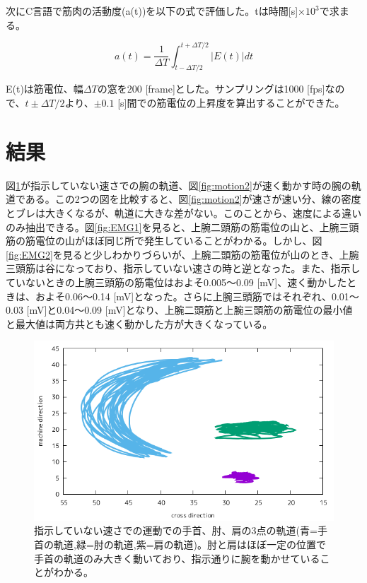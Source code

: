 \documentclass{jsarticle}
\begin{document}
次にC言語で筋肉の活動度(a(t))を以下の式で評価した。tは時間[s]×$10^3$で求まる。

\begin{equation}
a(t)=\frac{1}{\Delta{T}}\int^{t+\Delta{T}/2}_{t-\Delta{T}/2} |E(t)|dt
\end{equation}

E(t)は筋電位、幅$\Delta{T}$の窓を200 [frame]とした。サンプリングは1000 [fps]なので、$t\pm\Delta{T}/2$より、$\pm0.1$ [s]間での筋電位の上昇度を算出することができた。

\section{結果}

図\ref{fig:motion1}が指示していない速さでの腕の軌道、図\ref{fig:motion2}が速く動かす時の腕の軌道である。この2つの図を比較すると、図\ref{fig:motion2}が速さが速い分、線の密度とブレは大きくなるが、軌道に大きな差がない。このことから、速度による違いのみ抽出できる。図\ref{fig:EMG1}を見ると、上腕二頭筋の筋電位の山と、上腕三頭筋の筋電位の山がほぼ同じ所で発生していることがわかる。しかし、図\ref{fig:EMG2}を見ると少しわかりづらいが、上腕二頭筋の筋電位が山のとき、上腕三頭筋は谷になっており、指示していない速さの時と逆となった。また、指示していないときの上腕三頭筋の筋電位はおよそ0.005〜0.09 [mV]、速く動かしたときは、およそ0.06〜0.14 [mV]となった。さらに上腕三頭筋ではそれぞれ、0.01〜0.03 [mV]と0.04〜0.09 [mV]となり、上腕二頭筋と上腕三頭筋の筋電位の最小値と最大値は両方共とも速く動かした方が大きくなっている。

\begin{figure}[h]
  \begin{center}
    \includegraphics[clip,width=150mm]{Graph_2.png}
    \caption{指示していない速さでの運動での手首、肘、肩の3点の軌道(青=手首の軌道,緑=肘の軌道,紫=肩の軌道)。肘と肩はほぼ一定の位置で手首の軌道のみ大きく動いており、指示通りに腕を動かせていることがわかる。\label{fig:motion1}}
  \end{center}
\end{figure}
\end{document}
